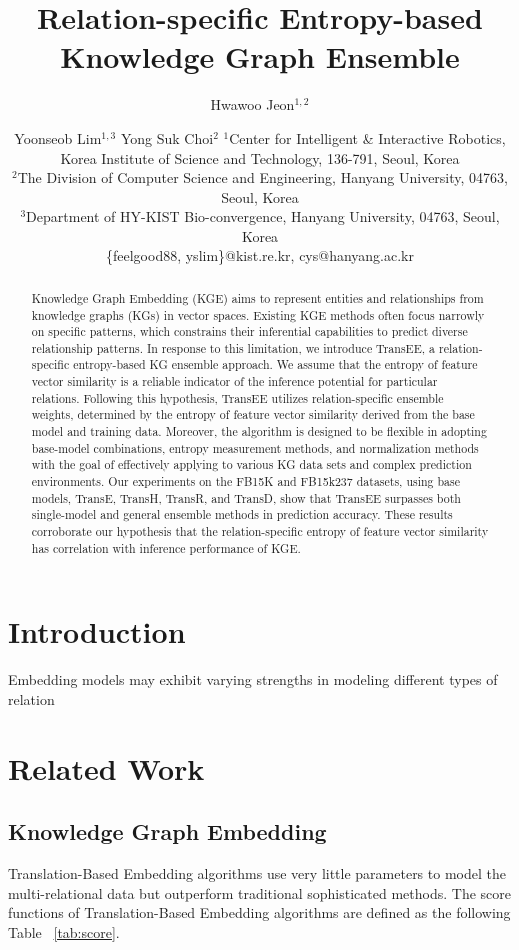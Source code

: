 \documentclass{article}
\title{Relation-specific Entropy-based Knowledge Graph Ensemble}
\author{
Hwawoo Jeon$^{1,2}$\and
Yoonseob Lim$^{1,3}$\And
Yong Suk Choi$^2$
\affiliations
$^1$Center for Intelligent \& Interactive Robotics\unskip,
Korea Institute of Science and Technology\unskip, 136-791\unskip, Seoul\unskip, Korea\\
$^2$The Division of Computer Science and Engineering\unskip,
Hanyang University\unskip, 04763\unskip, Seoul\unskip, Korea\\
$^3$Department of HY-KIST Bio-convergence\unskip,
Hanyang University\unskip, 04763\unskip, Seoul\unskip, Korea\\
\emails
\{feelgood88, yslim\}@kist.re.kr,
cys@hanyang.ac.kr
}
\begin{document}
\maketitle

\begin{abstract}
    Knowledge Graph Embedding (KGE) aims to represent entities and relationships from knowledge graphs (KGs) in vector spaces. Existing KGE methods often focus narrowly on specific patterns, which constrains their inferential capabilities to predict diverse relationship patterns. In response to this limitation, we introduce TransEE, a relation-specific entropy-based KG ensemble approach. We assume that the entropy of feature vector similarity is a reliable indicator of the inference potential for particular relations. Following this hypothesis, TransEE utilizes relation-specific ensemble weights, determined by the entropy of feature vector similarity derived from the base model and training data. Moreover, the algorithm is designed to be flexible in adopting base-model combinations, entropy measurement methods, and normalization methods with the goal of effectively applying to various KG data sets and complex prediction environments. Our experiments on the FB15K and FB15k237 datasets, using base models, TransE, TransH, TransR, and TransD, show that TransEE surpasses both single-model and general ensemble methods in prediction accuracy. These results corroborate our hypothesis that the relation-specific entropy of feature vector similarity has correlation with inference performance of KGE.

\end{abstract}

\section{Introduction}

Embedding models may exhibit varying strengths in modeling different types of relation

\section{Related Work}

\subsection{Knowledge Graph Embedding}

Translation-Based Embedding algorithms use very little parameters to model the multi-relational data but outperform traditional sophisticated methods. The score functions of Translation-Based Embedding algorithms are defined as the following Table ~\ref{tab:score}. 
\end{document}
